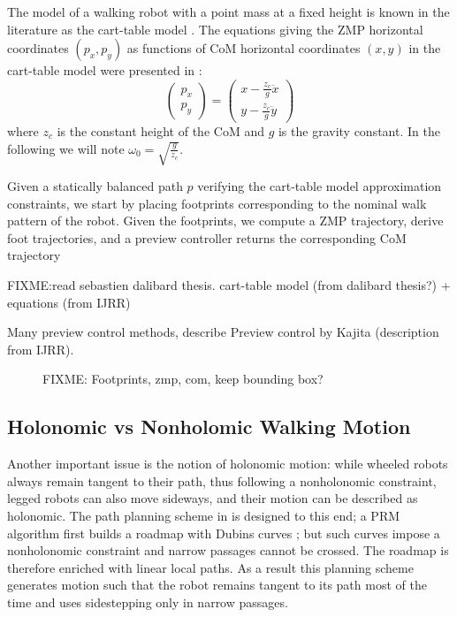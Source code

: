 The model of a walking robot with a point mass at a fixed height is
known in the literature as the cart-table model
\cite{kaji03}.  The equations giving the ZMP horizontal
coordinates $(p_x,p_y)$ as functions of CoM horizontal coordinates
$(x,y)$ in the cart-table model were presented in
\cite{kaji03}:
\begin{equation}
\label{eq:walk-zmp}
\left(
\begin{array}{c}
p_x\\ p_y
\end{array}
\right) = \displaystyle \left(
\begin{array}{c}
x - \frac{z_c}{g} \ddot{x}\\ y - \frac{z_c}{g} \ddot{y}
\end{array}
\right)
\end{equation}
where $z_c$ is  the constant height of the CoM and  $g$ is the gravity
constant.    In    the    following    we    will    note    $\omega_0
=\sqrt{\frac{g}{z_c}}$.

Given a statically balanced path $p$ verifying the cart-table model
approximation constraints, we start by placing footprints
corresponding to the nominal walk pattern of the robot. Given the
footprints, we compute a ZMP trajectory, derive foot trajectories, and
a preview controller returns the corresponding CoM trajectory

FIXME:read sebastien dalibard thesis.
cart-table model (from dalibard thesis?) + equations (from IJRR)

Many preview control methods, describe Preview control by Kajita
(description from IJRR).

\begin{figure}
  \centering
  
  \caption{FIXME: Footprints, zmp, com, keep bounding box?}
  \label{fig:chap1-zmp}
\end{figure}

\subsection{Holonomic vs Nonholomic Walking Motion}
\label{subsec:chap1-holonomic}

Another important issue is the notion of holonomic motion: while
wheeled robots always remain tangent to their path, thus following a
nonholonomic constraint, legged robots can also move sideways, and
their motion can be described as holonomic. The path planning scheme
in \cite{yosh08} is designed to this end; a PRM algorithm first builds
a roadmap with Dubins curves \cite{dubi57}; but such curves impose a
nonholonomic constraint and narrow passages cannot be crossed. The
roadmap is therefore enriched with linear local paths. As a result
this planning scheme generates motion such that the robot remains
tangent to its path most of the time and uses sidestepping only in
narrow passages.

